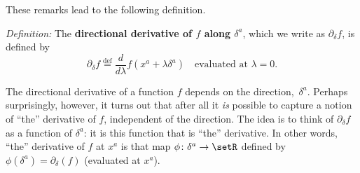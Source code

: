 \documentclass[10pt, a4paper]{article}
\newcommand{\isdef}{\mathrel{\stackrel{\text{def}}{=}}}
\begin{document}
These remarks lead to the following definition.

\emph{Definition:} The \textbf{directional derivative of $f$ along
  $\delta^a$}, which we write as $\partial_\delta f$, is defined by
\begin{equation}
\partial_\delta f \isdef \frac{d}{d\lambda} f(x^a+\lambda\delta^a) \quad\text{evaluated at $\lambda = 0$}.
  \label{eq:directional-derivative}
\end{equation}

The directional derivative of a function $f$ depends on the
direction,~$\delta^a$. Perhaps surprisingly, however, it turns out that
after all it \emph{is} possible to capture a notion of ``the''
derivative of $f$, independent of the direction. The idea is to think
of $\partial_\delta f$ as a function of $\delta^a$: it is this function that is ``the''
derivative. In other words, ``the'' derivative of $f$ at $x^a$ is that
map $\phi\colon \delta^a\to\setR$ defined by
$\phi(\delta^a) = \partial_\delta(f)$ (evaluated at $x^a$).
\end{document}
